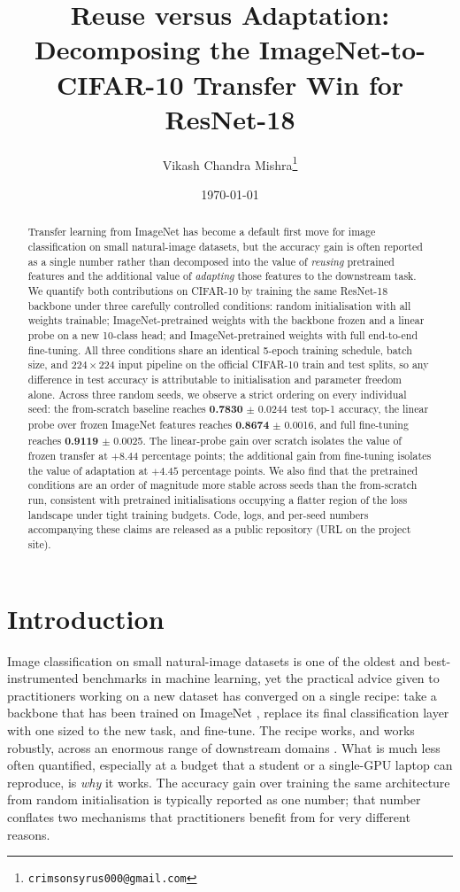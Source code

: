 \documentclass[11pt,twocolumn]{article}
\title{Reuse versus Adaptation: Decomposing the ImageNet-to-CIFAR-10 Transfer Win for ResNet-18}
\author[1]{Vikash Chandra Mishra\thanks{\texttt{crimsonsyrus000@gmail.com}}}
\affil[1]{Independent}
\date{\today}
\begin{document}
\maketitle


\begin{abstract}
Transfer learning from ImageNet has become a default first move for image classification on small natural-image datasets, but the accuracy gain is often reported as a single number rather than decomposed into the value of \emph{reusing} pretrained features and the additional value of \emph{adapting} those features to the downstream task. We quantify both contributions on CIFAR-10 by training the same ResNet-18 backbone under three carefully controlled conditions: random initialisation with all weights trainable; ImageNet-pretrained weights with the backbone frozen and a linear probe on a new 10-class head; and ImageNet-pretrained weights with full end-to-end fine-tuning. All three conditions share an identical 5-epoch training schedule, batch size, and $224{\times}224$ input pipeline on the official CIFAR-10 train and test splits, so any difference in test accuracy is attributable to initialisation and parameter freedom alone. Across three random seeds, we observe a strict ordering on every individual seed: the from-scratch baseline reaches \textbf{0.7830} $\pm$ 0.0244 test top-1 accuracy, the linear probe over frozen ImageNet features reaches \textbf{0.8674} $\pm$ 0.0016, and full fine-tuning reaches \textbf{0.9119} $\pm$ 0.0025. The linear-probe gain over scratch isolates the value of frozen transfer at $+8.44$ percentage points; the additional gain from fine-tuning isolates the value of adaptation at $+4.45$ percentage points. We also find that the pretrained conditions are an order of magnitude more stable across seeds than the from-scratch run, consistent with pretrained initialisations occupying a flatter region of the loss landscape under tight training budgets. Code, logs, and per-seed numbers accompanying these claims are released as a public repository (URL on the project site).
\end{abstract}

\section{Introduction}

Image classification on small natural-image datasets is one of the
oldest and best-instrumented benchmarks in machine learning, yet the
practical advice given to practitioners working on a new dataset has
converged on a single recipe: take a backbone that has been trained on
ImageNet \cite{deng2009imagenet}, replace its final classification
layer with one sized to the new task, and fine-tune. The recipe works,
and works robustly, across an enormous range of downstream domains
\cite{kornblith2019better,yosinski2014transferable}. What is much less
often quantified, especially at a budget that a student or a
single-GPU laptop can reproduce, is \emph{why} it works. The accuracy
gain over training the same architecture from random initialisation
is typically reported as one number; that number conflates two
mechanisms that practitioners benefit from for very different reasons.
\end{document}
